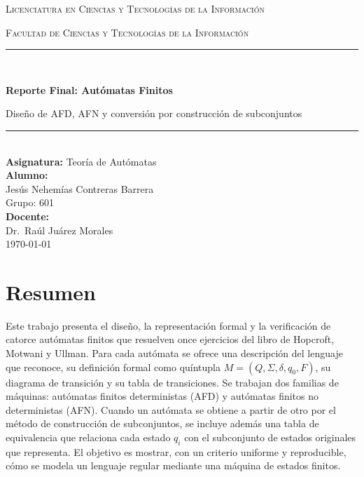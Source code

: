 \documentclass[12pt]{article}
\begin{document}
\begin{titlepage}
\centering


{\scshape\large Licenciatura en Ciencias y Tecnologías de la Información\par}
{\scshape Facultad de Ciencias y Tecnologías de la Información\par}
\vspace{2cm}

{\rule{\textwidth}{0.5pt}}\\[0.4cm]
{\huge\bfseries Reporte Final: Autómatas Finitos\par}
{\large Diseño de AFD, AFN y conversión por construcción de subconjuntos\par}
{\rule{\textwidth}{0.5pt}}\\[2cm]

{\large\bfseries Asignatura:} {\large Teoría de Autómatas}\\[1cm]

{\large\bfseries Alumno:}\\[0.2cm]
{\large Jesús Nehemías Contreras Barrera}\\
{\large Grupo: 601}\\[1cm]

{\large\bfseries Docente:}\\[0.2cm]
{\large Dr.\ Raúl Juárez Morales}\\

\vfill
{\large \today}

\end{titlepage}

\clearpage
\section*{Resumen}

Este trabajo presenta el diseño, la representación formal y la verificación de catorce autómatas finitos que resuelven once ejercicios del libro de Hopcroft, Motwani y Ullman. Para cada autómata se ofrece una descripción del lenguaje que reconoce, su definición formal como quíntupla $M=(Q,\Sigma,\delta,q_0,F)$, su diagrama de transición y su tabla de transiciones. Se trabajan dos familias de máquinas: autómatas finitos deterministas (AFD) y autómatas finitos no deterministas (AFN). Cuando un autómata se obtiene a partir de otro por el método de construcción de subconjuntos, se incluye además una tabla de equivalencia que relaciona cada estado $q_i$ con el subconjunto de estados originales que representa. El objetivo es mostrar, con un criterio uniforme y reproducible, cómo se modela un lenguaje regular mediante una máquina de estados finitos.
\end{document}
